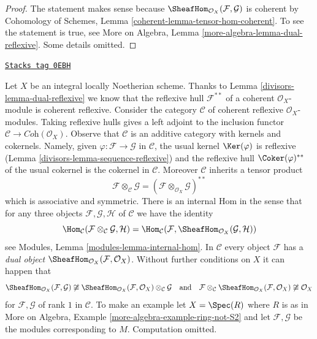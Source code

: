 \begin{proof}
The statement makes sense because
$\SheafHom_{\mathcal{O}_X}(\mathcal{F}, \mathcal{G})$
is coherent by Cohomology of Schemes, Lemma
\ref{coherent-lemma-tensor-hom-coherent}.
To see the statement is true, see
More on Algebra, Lemma \ref{more-algebra-lemma-dual-reflexive}.
Some details omitted.
\end{proof}

\begin{remark}[Tensor]
\label{divisors-remark-tensor}
\href{https://stacks.math.columbia.edu/tag/0EBH}{\texttt{Stacks tag 0EBH}}

Let $X$ be an integral locally Noetherian scheme. Thanks to
Lemma \ref{divisors-lemma-dual-reflexive} we know that the reflexive
hull $\mathcal{F}^{**}$ of a coherent $\mathcal{O}_X$-module
is coherent reflexive. Consider the category $\mathcal{C}$
of coherent reflexive $\mathcal{O}_X$-modules. Taking
reflexive hulls gives a left adjoint to the inclusion functor
$\mathcal{C} \to \textit{Coh}(\mathcal{O}_X)$.
Observe that $\mathcal{C}$ is an additive category
with kernels and cokernels. Namely, given
$\varphi : \mathcal{F} \to \mathcal{G}$ in $\mathcal{C}$, the
usual kernel $\Ker(\varphi)$ is reflexive
(Lemma \ref{divisors-lemma-sequence-reflexive}) and the reflexive hull
$\Coker(\varphi)^{**}$ of the usual cokernel
is the cokernel in $\mathcal{C}$. Moreover $\mathcal{C}$ inherits
a tensor product
$$
\mathcal{F} \otimes_\mathcal{C} \mathcal{G} =
(\mathcal{F} \otimes_{\mathcal{O}_X} \mathcal{G})^{**}
$$
which is associative and symmetric. There is an internal Hom
in the sense that for any three objects
$\mathcal{F}, \mathcal{G}, \mathcal{H}$ of
$\mathcal{C}$ we have the identity
$$
\Hom_\mathcal{C}(\mathcal{F} \otimes_\mathcal{C} \mathcal{G}, \mathcal{H}) =
\Hom_\mathcal{C}(\mathcal{F},
\SheafHom_{\mathcal{O}_X}(\mathcal{G}, \mathcal{H}))
$$
see Modules, Lemma \ref{modules-lemma-internal-hom}. In $\mathcal{C}$
every object $\mathcal{F}$ has a {\it dual object}
$\SheafHom_{\mathcal{O}_X}(\mathcal{F}, \mathcal{O}_X)$.
Without further conditions on $X$ it can happen that
$$
\SheafHom_{\mathcal{O}_X}(\mathcal{F}, \mathcal{G}) \not \cong
\SheafHom_{\mathcal{O}_X}(\mathcal{F}, \mathcal{O}_X)
\otimes_\mathcal{C} \mathcal{G}
\quad\text{and}\quad
\mathcal{F} \otimes_\mathcal{C}
\SheafHom_{\mathcal{O}_X}(\mathcal{F}, \mathcal{O}_X)
\not \cong \mathcal{O}_X
$$
for $\mathcal{F}, \mathcal{G}$ of rank $1$ in $\mathcal{C}$.
To make an example let $X = \Spec(R)$ where $R$ is as in
More on Algebra, Example \ref{more-algebra-example-ring-not-S2}
and let $\mathcal{F}, \mathcal{G}$ be the modules corresponding to $M$.
Computation omitted.
\end{remark}

